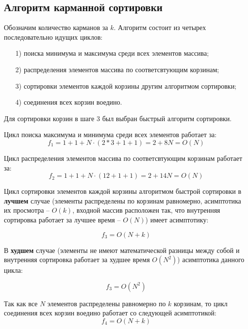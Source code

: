 \documentclass[12pt]{report}
\begin{document}
	\subsection{Алгоритм карманной сортировки}
	
	Обозначим количество карманов за $k$. Алгоритм состоит из четырех последовательно идущих циклов: 
	\begin{enumerate}
		\item[1)] поиска минимума и максимума среди всех элементов массива;
		\item[2)] распределения элементов массива по соответсвтующим корзинам;
		\item[3)] сортировки элементов каждой корзины другим алгоритмом сортировки;
		\item[4)] соединения всех корзин воедино.
	\end{enumerate}
	
	Для сортировки корзин в шаге 3 был выбран быстрый алгоритм сортировки.
	\newline
	
	Цикл поиска максимума и минимума среди всех элементов работает за:
	\begin{equation}
		f_{1} = 1 + 1 + N\cdot(2 * 3 + 1 + 1) = 2 + 8N = O(N)
	\end{equation}
	
	Цикл распределения элементов массива по соответсвтующим корзинам работает за:
	\begin{equation}
		f_{2} = 1 + 1 + N\cdot(12 + 1 + 1) = 2 + 14N = O(N)
	\end{equation}
	
	Цикл сортировки элементов каждой корзины алгоритмом быстрой сортировки в \textbf{лучшем} случае (элементы распределены по корзинам равномерно, асимптотика их просмотра -- $O(k)$, входной массив расположен так, что внутренняя сортировка работает за лучшее время -- $O(N)$) имеет асимптотику:
	
	\begin{equation}
	f_{3} = O(N + k)
	\end{equation}
	
	В \textbf{худшем} случае (элементы не имеют математической разницы между собой и внутренняя сортировка работает за худшее время $O(N^2)$) асимптотика данного цикла: 
	
	\begin{equation}
	f_{3} = O(N^2)
	\end{equation}
	
	Так как все $N$ элементов распределены равномерно по $k$ корзинам, то цикл соединения всех корзин воедино работает со следующей асимптотикой:
	\begin{equation}
		f_{4} = O(N + k)
	\end{equation}
	
\end{document}
